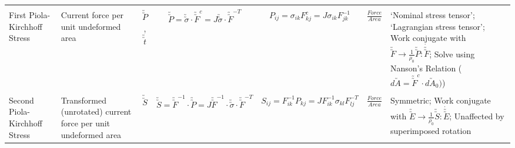 \documentclass[10pt]{article}
\newcommand{\tu}[1]{\utilde{#1}}
\newcommand{\tuu}[1]{\utilde{\utilde{#1}}}
\begin{document}
\begin{center}
\begin{tabular}{l m{3in} c c c c m{5in}}
\hline
\\[-1ex]
First Piola-Kirchhoff Stress
&%
Current force per unit undeformed area
&%
$ \tuu{P} $, $\tuu{t}$
&%
$ \tuu{P} = \tuu{\sigma}\cdot\tuu{F}^{c}  = J \tuu{\sigma}\cdot\tuu{F}^{-T}$
&%
$ P_{ij} = \sigma_{ik} F^{c}_{kj}  = J \sigma_{ik} F^{-1}_{jk}$
&%
$ \frac{Force}{Area} $
&%
`Nominal stress tensor'; `Lagrangian stress tensor'; Work conjugate with $\tuu{F} \rightarrow \frac{1}{\rho_0}\tuu{P}\colon\dot{\tuu{F}}$; Solve using Nanson's Relation ($d\tu{A}=\tuu{F}^{c}\cdot d\tu{A}_{0})$)
\\[1ex]



\hline
\\[-1ex]
Second Piola-Kirchhoff Stress
&%
Transformed (unrotated) current force per unit undeformed area
&%
$ \tuu{S} $
&%
$ \tuu{S} = \tuu{F}^{-1}\cdot\tuu{P} = J \tuu{F}^{-1} \cdot \tuu{\sigma} \cdot \tuu{F}^{-T}$
&%
$ S_{ij} = F^{-1}_{ik} P_{kj} = J F^{-1}_{ik} \sigma_{kl} F^{-T}_{lj}$
&%
$ \frac{Force}{Area} $
&%
Symmetric; Work conjugate with $\tuu{E} \rightarrow \frac{1}{\rho_0}\tuu{S}\colon\dot{\tuu{E}}$; Unaffected by superimposed rotation
\\[1ex]




\end{tabular}
\end{center}
\end{document}
